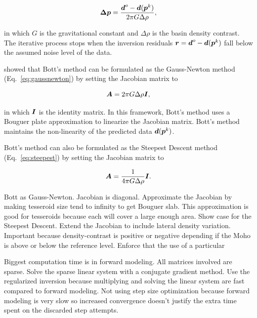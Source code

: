 \documentclass[extra]{gji}
\newcommand{\eq}[1]{Eq.~\ref{eq:#1}}
\newcommand{\mbf}[1]{\hbox{\mathversion{bold}$#1$}}
\begin{document}
\begin{equation}
    \mbf{\Delta p} = \dfrac{\mbf{d}^o - \mbf{d}(\mbf{p}^k)}{2\pi G \Delta \rho},
    \label{eq:bott}
\end{equation}

\noindent
in which $G$ is the gravitational constant and $\Delta \rho$ is the basin
density contrast.
The iterative process stops when the inversion residuals
$\mbf{r} = \mbf{d}^o - \mbf{d}(\mbf{p}^k)$ fall below the assumed noise level
of the data.

\citet{silva_fast_2014} showed that Bott's method can be formulated as
the Gauss-Newton method (\eq{gaussnewton})
by setting the Jacobian matrix to

\begin{equation}
    \mbf{A} = 2\pi G \Delta \rho \mbf{I},
    \label{eq:bott-jacobian}
\end{equation}

\noindent
in which $\mbf{I}$ is the identity matrix.
In this framework, Bott's method uses a Bouguer plate approximation to
linearize the Jacobian matrix.
Bott's method maintains the non-linearity of the predicted data
$\mbf{d}(\mbf{p}^k)$.


Bott's method can also be formulated as the Steepest Descent method
(\eq{steepest}) by setting the Jacobian matrix to

\begin{equation}
    \mbf{A} = \dfrac{1}{4 \pi G \Delta \rho}\mbf{I}.
    \label{eq:bott-steepest}
\end{equation}


Bott as Gauss-Newton.
Jacobian is diagonal.
Approximate the Jacobian by making tesseroid size tend to infinity to get
Bouguer slab.
This approximation is good for tesseroids because each will cover a large
enough area.
Show case for the Steepest Descent.
Extend the Jacobian to include lateral density variation.
Important because density-contrast is positive or negative depending if the
Moho is above or below the reference level.
Enforce that the use of a particular

Biggest computation time is in forward modeling.
All matrices involved are sparse.
Solve the sparse linear system with a conjugate gradient method.
Use the regularized inversion because multiplying and solving the linear system
are fast compared to forward modeling.
Not using step size optimization because forward modeling is very slow so
increased convergence doesn't justify the extra time spent on the discarded
step attempts.
\end{document}
